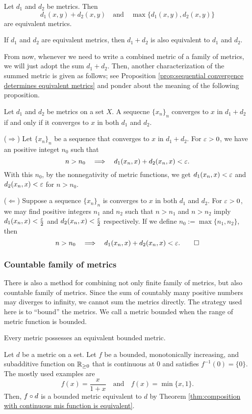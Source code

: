 \begin{ex}
Let $d_1$ and $d_2$ be metrics.
Then
\[d_1(x,y)+d_2(x,y)\quad\text{and}\quad\max\{d_1(x,y),d_2(x,y)\}\]
are equivalent metrics.
\end{ex}
\begin{ex}
If $d_1$ and $d_2$ are equivalent metrics, then $d_1+d_2$ is also equivalent to $d_1$ and $d_2$.
\end{ex}

From now, whenever we need to write a combined metric of a family of metrics, we will just adopt the sum $d_1+d_2$.
Then, another characterization of the summed metric is given as follows; see Proposition \ref{prop:sequential convergence determines equivalent metrics} and ponder about the meaning of the following proposition.

\begin{prop}\label{prop:summed metric convergence}
Let $d_1$ and $d_2$ be metrics on a set $X$.
A sequecne $\{x_n\}_n$ converges to $x$ in $d_1+d_2$ if and only if it converges to $x$ in both $d_1$ and $d_2$.
\end{prop}
\begin{pf}
($\Rightarrow$)
Let $\{x_n\}_n$ be a sequence that converges to $x$ in $d_1+d_2$.
For $\varepsilon>0$, we have an positive integet $n_0$ such that
\[n>n_0\impl d_1(x_n,x)+d_2(x_n,x)<\e.\]
With this $n_0$, by the nonnegativity of metric functions, we get $d_1(x_n,x)<\varepsilon$ and $d_2(x_n,x)<\varepsilon$ for $n>n_0$.

($\Leftarrow$)
Suppose a sequence $\{x_n\}_n$ is converges to $x$ in both $d_1$ and $d_2$.
For $\varepsilon>0$, we may find positive integers $n_1$ and $n_2$ such that $n>n_1$ and $n>n_2$ imply $d_1(x_n,x)<\frac{\varepsilon}2$ and $d_2(x_n,x)<\frac{\varepsilon}2$ respectively.
If we define $n_0:=\max\{n_1,n_2\}$, then
\[n>n_0\impl d_1(x_n,x)+d_2(x_n,x)<\e.\qedhere\]
\end{pf}

\subsubsection{Countable family of metrics}
There is also a method for combining not only finite family of metrics, but also countable family of metrics.
Since the sum of countably many positive numbers may diverges to infinity, we cannot sum the metrics directly.
The strategy used here is to ``bound'' the metrics.
We call a metric bounded when the range of metric function is bounded.

\begin{prop}
Every metric possesses an equivalent bounded metric.
\end{prop}
\begin{pf}
Let $d$ be a metric on a set.
Let $f$ be a bounded, monotonically increasing, and subadditive function on $\mathbb{R}_{\ge0}$ that is continuous at 0 and satisfies $f^{-1}(0)=\{0\}$.
The mostly used examples are
\[f(x)=\frac x{1+x}\quad\text{and}\quad f(x)=\min\{x,1\}.\]
Then, $f\o d$ is a bounded metric equivalent to $d$ by Theorem \ref{thm:composition with continuous mis function is equivalent}.
\end{pf}

